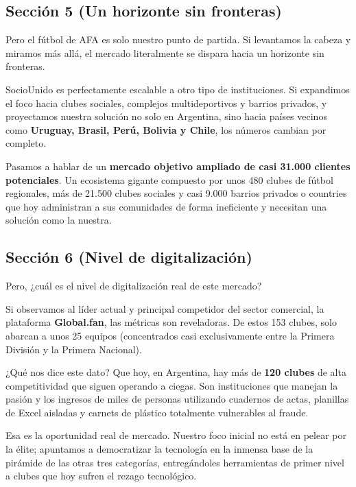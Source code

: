 \subsection{Sección 5 (Un horizonte sin fronteras)}

Pero el fútbol de AFA es solo nuestro punto de partida. Si levantamos la cabeza y miramos más allá, el mercado literalmente se dispara hacia un horizonte sin fronteras.

SocioUnido es perfectamente escalable a otro tipo de instituciones. Si expandimos el foco hacia clubes sociales, complejos multideportivos y barrios privados, y proyectamos nuestra solución no solo en Argentina, sino hacia países vecinos como \textbf{Uruguay, Brasil, Perú, Bolivia y Chile}, los números cambian por completo.

Pasamos a hablar de un \textbf{mercado objetivo ampliado de casi 31.000 clientes potenciales}. Un ecosistema gigante compuesto por unos 480 clubes de fútbol regionales, más de 21.500 clubes sociales y casi 9.000 barrios privados o countries que hoy administran a sus comunidades de forma ineficiente y necesitan una solución como la nuestra.

\subsection{Sección 6 (Nivel de digitalización)}

Pero, ¿cuál es el nivel de digitalización real de este mercado? 

Si observamos al líder actual y principal competidor del sector comercial, la plataforma \textbf{Global.fan}, las métricas son reveladoras. De estos 153 clubes, solo abarcan a unos 25 equipos (concentrados casi exclusivamente entre la Primera División y la Primera Nacional).

¿Qué nos dice este dato?
Que hoy, en Argentina, hay más de \textbf{120 clubes} de alta competitividad que siguen operando a ciegas. Son instituciones que manejan la pasión y los ingresos de miles de personas utilizando cuadernos de actas, planillas de Excel aisladas y carnets de plástico totalmente vulnerables al fraude.

\newpage

Esa es la oportunidad real de mercado. Nuestro foco inicial no está en pelear por la élite; apuntamos a democratizar la tecnología en la inmensa base de la pirámide de las otras tres categorías, entregándoles herramientas de primer nivel a clubes que hoy sufren el rezago tecnológico.

